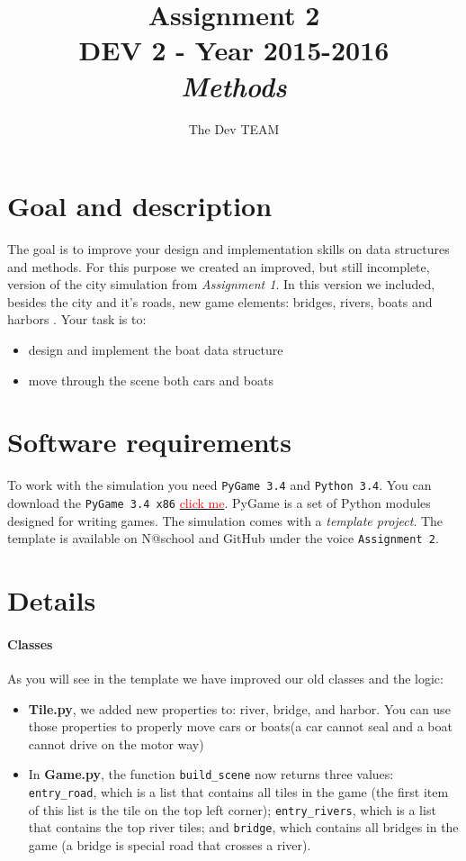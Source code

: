 \documentclass[10pt,a4paper]{article}
\begin{document}
\title{Assignment 2\\DEV 2 - Year 2015-2016\\\textit{Methods}}
\author{The Dev TEAM}
\maketitle


\section{Goal and description}
The goal is to improve your design and implementation skills on data structures and methods. For this purpose we created an improved, but still incomplete, version of the city simulation from \textit{Assignment 1}. In this version we included, besides the city and it's roads, new game elements: bridges, rivers, boats and harbors . Your task is to:
\begin{itemize}
\item design and implement the boat data structure  
\item move through the scene both cars and boats
\end{itemize}
	
	
\section{Software requirements}
To work with the simulation you need \texttt{PyGame 3.4} and \texttt{Python 3.4}. You can download the \texttt{PyGame 3.4 x86} \href{https://bitbucket.org/pygame/pygame/downloads/pygame-1.9.2a0-hg_ea3b3bb8714a.win32-py3.4.msi}{\textcolor{red}{click me}}. PyGame is a set of Python modules designed for writing games.	The simulation comes with a \textit{template project}. The template is available on N@school and GitHub under the voice \texttt{Assignment 2}.

\section{Details}

\paragraph{Classes}
As you will see in the template we have improved our old classes and the logic:

\begin{itemize}
	\item \textbf{Tile.py}, we added new properties to: river, bridge, and harbor. You can use those properties to properly move cars or boats(a car cannot seal and a boat cannot drive on the motor way)
	
	\item In \textbf{Game.py}, the function \texttt{build\_scene} now returns three values: \texttt{entry\_road}, which is a list that contains all tiles in the game (the first item of this list is the tile on the top left corner); \texttt{entry\_rivers}, which is a list that contains the top river tiles; and \texttt{bridge}, which contains all bridges in the game (a bridge is special road that crosses a river).
\end{itemize} 
\end{document}
